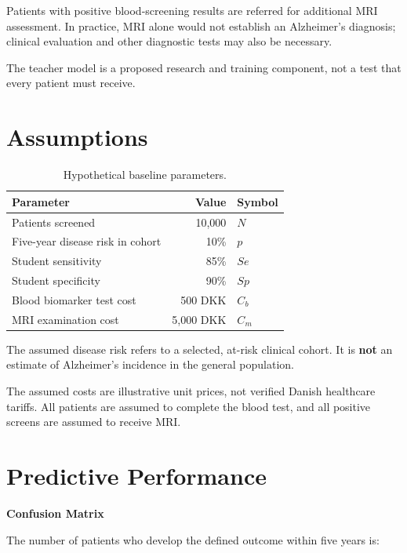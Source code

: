 \documentclass[11pt,a4paper]{article}
\newcommand{\subheading}[1]{%
    \vspace{3mm}
    {\large\bfseries\color{DTUblue}#1}\par
}
\begin{document}
Patients with positive blood-screening results are
referred for additional MRI assessment. In practice,
MRI alone would not establish an Alzheimer's diagnosis;
clinical evaluation and other diagnostic tests may
also be necessary.

The teacher model is a proposed research and training
component, not a test that every patient must receive.

\section{Assumptions}

\begin{table}[H]
\centering
\caption{Hypothetical baseline parameters.}
\begin{tabularx}{\linewidth}{@{}Xrl@{}}
\toprule
\textbf{Parameter} & \textbf{Value} & \textbf{Symbol} \\
\midrule
Patients screened & 10,000 & $N$ \\
Five-year disease risk in cohort & 10\% & $p$ \\
Student sensitivity & 85\% & $Se$ \\
Student specificity & 90\% & $Sp$ \\
Blood biomarker test cost & 500 DKK & $C_b$ \\
MRI examination cost & 5,000 DKK & $C_m$ \\
\bottomrule
\end{tabularx}
\end{table}

The assumed disease risk refers to a selected,
at-risk clinical cohort. It is \textbf{not} an estimate
of Alzheimer's incidence in the general population.

The assumed costs are illustrative unit prices,
not verified Danish healthcare tariffs.
All patients are assumed to complete the blood test,
and all positive screens are assumed to receive MRI.

\section{Predictive Performance}

\subheading{Confusion Matrix}

The number of patients who develop the defined outcome
within five years is:
\end{document}
